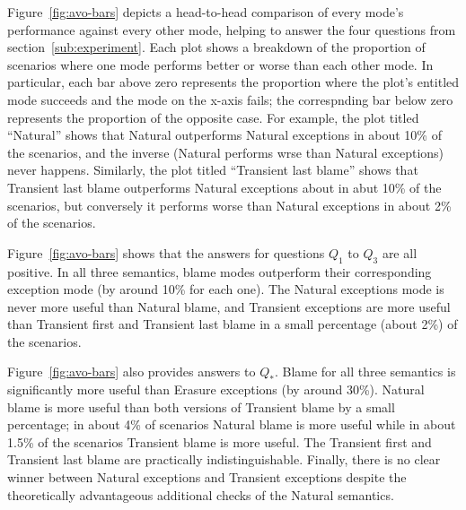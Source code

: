 Figure~\ref{fig:avo-bars} depicts a head-to-head comparison of every mode's performance against every other mode, helping to answer the four questions from section~\ref{sub:experiment}.
Each plot shows a breakdown of the proportion of scenarios where one mode performs better or worse than each other mode.
In particular, each bar above zero represents the proportion where the plot's entitled mode succeeds and the mode on the x-axis fails; the correspnding bar below zero represents the proportion of the opposite case.
For example, the plot titled ``Natural'' shows that Natural outperforms Natural exceptions in about 10\% of the scenarios, and the inverse (Natural performs wrse than Natural exceptions) never happens.
Similarly, the plot titled ``Transient last blame'' shows that Transient last blame outperforms Natural exceptions about in abut 10\% of the scenarios, but conversely it performs worse than Natural exceptions in about 2\% of the scenarios.

Figure~\ref{fig:avo-bars} shows that the answers for questions $Q_1$ to $Q_3$ are all positive.
In all three semantics, blame modes outperform their corresponding exception mode (by around 10\% for each one).
The Natural exceptions mode is never more useful than Natural blame, and  Transient
exceptions are more useful than Transient first and Transient last blame
in a small percentage (about 2\%) of the scenarios. 

Figure~\ref{fig:avo-bars} also provides answers to $Q_*$.
Blame for all three semantics is significantly
more useful than Erasure exceptions (by around 30\%). Natural blame is
more useful than both versions of Transient blame by a small percentage;
in about 4\% of scenarios Natural blame is more useful while in about 1.5\% of the
scenarios Transient blame is more useful. The Transient first and
Transient last blame are practically indistinguishable. Finally, there is
no clear winner between Natural exceptions and Transient exceptions
despite the theoretically advantageous additional checks of the Natural
semantics.

